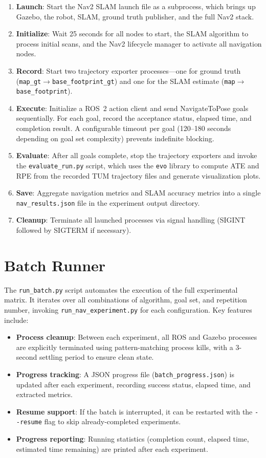 \begin{enumerate}
\item \textbf{Launch}: Start the Nav2 SLAM launch file as a subprocess, which brings up Gazebo, the robot, SLAM, ground truth publisher, and the full Nav2 stack.
\item \textbf{Initialize}: Wait 25 seconds for all nodes to start, the SLAM algorithm to process initial scans, and the Nav2 lifecycle manager to activate all navigation nodes.
\item \textbf{Record}: Start two trajectory exporter processes---one for ground truth (\texttt{map\_gt}$\rightarrow$\texttt{base\_footprint\_gt}) and one for the SLAM estimate (\texttt{map}$\rightarrow$\texttt{base\_footprint}).
\item \textbf{Execute}: Initialize a ROS~2 action client and send NavigateToPose goals sequentially. For each goal, record the acceptance status, elapsed time, and completion result. A configurable timeout per goal (120--180 seconds depending on goal set complexity) prevents indefinite blocking.
\item \textbf{Evaluate}: After all goals complete, stop the trajectory exporters and invoke the \texttt{evaluate\_run.py} script, which uses the \texttt{evo} library to compute ATE and RPE from the recorded TUM trajectory files and generate visualization plots.
\item \textbf{Save}: Aggregate navigation metrics and SLAM accuracy metrics into a single \texttt{nav\_results.json} file in the experiment output directory.
\item \textbf{Cleanup}: Terminate all launched processes via signal handling (SIGINT followed by SIGTERM if necessary).
\end{enumerate}

\section{Batch Runner}

The \texttt{run\_batch.py} script automates the execution of the full experimental matrix. It iterates over all combinations of algorithm, goal set, and repetition number, invoking \texttt{run\_nav\_experiment.py} for each configuration. Key features include:

\begin{itemize}
\item \textbf{Process cleanup}: Between each experiment, all ROS and Gazebo processes are explicitly terminated using pattern-matching process kills, with a 3-second settling period to ensure clean state.
\item \textbf{Progress tracking}: A JSON progress file (\texttt{batch\_progress.json}) is updated after each experiment, recording success status, elapsed time, and extracted metrics.
\item \textbf{Resume support}: If the batch is interrupted, it can be restarted with the \texttt{-{}-resume} flag to skip already-completed experiments.
\item \textbf{Progress reporting}: Running statistics (completion count, elapsed time, estimated time remaining) are printed after each experiment.
\end{itemize}

